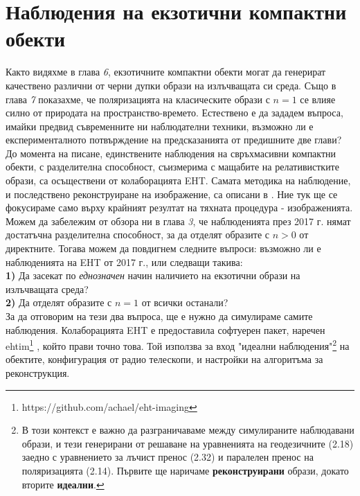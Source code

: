\section{Наблюдения на екзотични компактни обекти}
Както видяхме в глава \emph{6}, екзотичните компактни обекти могат да генерират качествено различни от черни дупки образи на излъчващата си среда. Също в глава \emph{7} показахме, че поляризацията на класическите образи с $n = 1$ се влияе силно от природата на пространство-времето. Естествено е да зададем въпроса, имайки предвид съвременните ни наблюдателни техники, възможно ли е експерименталното потвърждение на предсказанията от предишните две глави?\\

До момента на писане, единствените наблюдения на свръхмасивни компактни обекти, с разделителна способност, съизмерима с мащабите на релативистките образи, са осъществени от колаборацията EHT. Самата методика на наблюдение, и последствено реконструиране на изображение, са описани в \cite{EHT_M87_II}\cite{EHT_M87_III}. Ние тук ще се фокусираме само върху крайният резултат на тяхната процедура - изображенията. Можем да забележим от обзора ни в глава \emph{3}, че наблюденията през 2017 г. нямат достатъчна разделителна способност, за да отделят образите с $n > 0 $ от директните. Тогава можем да повдигнем следните въпроси: възможно ли е наблюденията на EHT от 2017 г., или следващи такива:\\

\textbf{1)} Да засекат по \emph{еднозначен} начин наличието на екзотични образи на излъчващата среда?\\

\textbf{2)} Да отделят образите с $n = 1$ от всички останали?\\

За да отговорим на тези два въпроса, ще е нужно да симулираме самите наблюдения. Колаборацията EHT е предоставила софтуерен пакет, наречен ehtim\footnote{https://github.com/achael/eht-imaging} \cite{EHTIM}, който прави точно това. Той използва за вход "идеални наблюдения"\footnote{В този контекст е важно да разграничаваме между симулираните наблюдавани образи, и тези генерирани от решаване на уравненията на геодезичните (2.18) заедно с уравнението за лъчист пренос (2.32) и паралелен пренос на поляризацията (2.14). Първите ще наричаме \textbf{реконструирани} образи, докато вторите \textbf{идеални}.} на обектите, конфигурация от радио телескопи, и настройки на алгоритъма за реконструкция. \\

